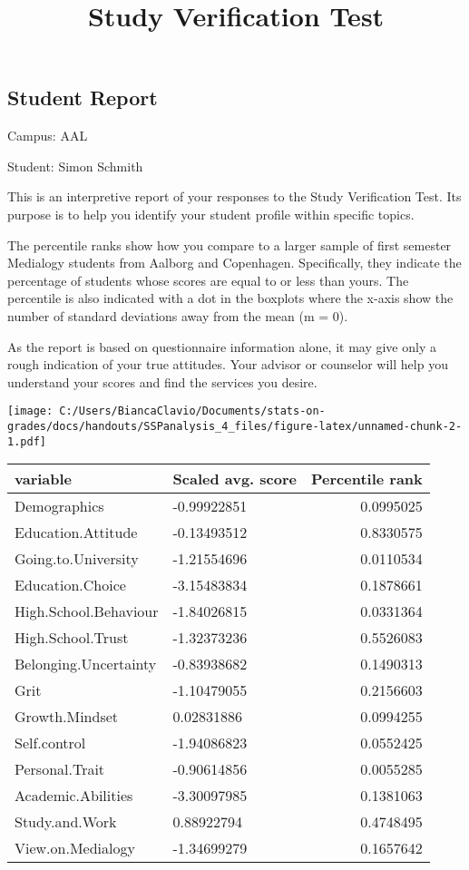 \documentclass[]{article}
\title{Study Verification Test}
\author{}
\date{}
\begin{document}
\maketitle

\subsection{Student Report}\label{student-report}

Campus: AAL

Student: Simon Schmith

This is an interpretive report of your responses to the Study
Verification Test. Its purpose is to help you identify your student
profile within specific topics.

The percentile ranks show how you compare to a larger sample of first
semester Medialogy students from Aalborg and Copenhagen. Specifically,
they indicate the percentage of students whose scores are equal to or
less than yours. The percentile is also indicated with a dot in the
boxplots where the x-axis show the number of standard deviations away
from the mean (m = 0).

As the report is based on questionnaire information alone, it may give
only a rough indication of your true attitudes. Your advisor or
counselor will help you understand your scores and find the services you
desire.

\texttt{[image: C:/Users/BiancaClavio/Documents/stats-on-grades/docs/handouts/SSPanalysis\_4\_files/figure-latex/unnamed-chunk-2-1.pdf]}

\begin{longtable}[]{@{}llr@{}}
\toprule
variable & Scaled avg. score & Percentile rank\tabularnewline
\midrule
\endhead
Demographics & -0.99922851 & 0.0995025\tabularnewline
Education.Attitude & -0.13493512 & 0.8330575\tabularnewline
Going.to.University & -1.21554696 & 0.0110534\tabularnewline
Education.Choice & -3.15483834 & 0.1878661\tabularnewline
High.School.Behaviour & -1.84026815 & 0.0331364\tabularnewline
High.School.Trust & -1.32373236 & 0.5526083\tabularnewline
Belonging.Uncertainty & -0.83938682 & 0.1490313\tabularnewline
Grit & -1.10479055 & 0.2156603\tabularnewline
Growth.Mindset & 0.02831886 & 0.0994255\tabularnewline
Self.control & -1.94086823 & 0.0552425\tabularnewline
Personal.Trait & -0.90614856 & 0.0055285\tabularnewline
Academic.Abilities & -3.30097985 & 0.1381063\tabularnewline
Study.and.Work & 0.88922794 & 0.4748495\tabularnewline
View.on.Medialogy & -1.34699279 & 0.1657642\tabularnewline
\bottomrule
\end{longtable}
\end{document}
